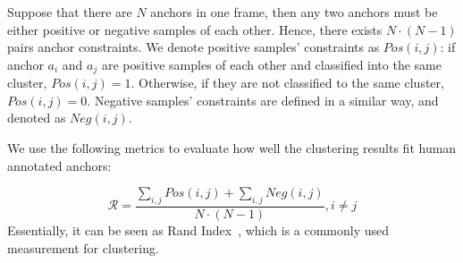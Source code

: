 \documentclass[letterpaper, 10 pt, conference]{ieeeconf}  %
\begin{document}
Suppose that there are $N$ anchors in one frame, then any two anchors must be either positive or negative samples of each other. Hence, there exists $N \cdot(N-1)$ pairs anchor constraints.
We denote positive samples' constraints as $Pos(i,j)$: if anchor $a_i$ and $a_j$ are positive samples of each other and classified into the same cluster, $Pos(i,j)=1$. Otherwise, if they are not classified to the same cluster, $Pos(i,j)=0$.
Negative samples' constraints are defined in a similar way, and denoted as $Neg(i,j)$.

We use the following metrics to evaluate how well the clustering results fit human annotated anchors:

\begin{equation}
\mathcal{R}=\dfrac{\sum_{i,j}{Pos(i,j)}+\sum_{i,j}{Neg(i,j)}}{N\cdot (N-1)}, i \neq j
\end{equation}
Essentially, it can be seen as Rand Index~\cite{rand1971objective}, which is a commonly used measurement for clustering.
\end{document}
